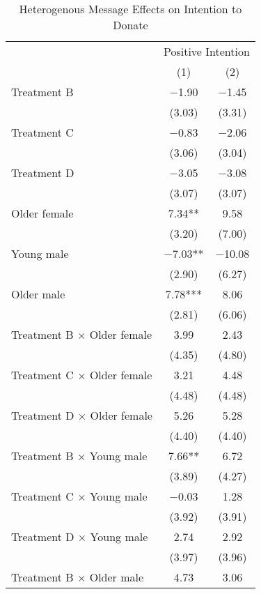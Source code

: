 \documentclass[12pt, a4paper]{article}
\begin{document}
\begin{table}[H]

\caption{\label{tab:int-lm-interaction-reg}Heterogenous Message Effects on Intention to Donate}
\centering
\fontsize{8}{10}\selectfont
\begin{threeparttable}
\begin{tabular}[t]{lcc}
\toprule
\multicolumn{1}{c}{ } & \multicolumn{2}{c}{Positive Intention} \\
\cmidrule(l{3pt}r{3pt}){2-3}
  & (1) & (2)\\
\midrule
Treatment B & \num{-1.90} & \num{-1.45}\\
 & (\num{3.03}) & (\num{3.31})\\
Treatment C & \num{-0.83} & \num{-2.06}\\
 & (\num{3.06}) & (\num{3.04})\\
Treatment D & \num{-3.05} & \num{-3.08}\\
 & (\num{3.07}) & (\num{3.07})\\
Older female & \num{7.34}** & \num{9.58}\\
 & (\num{3.20}) & (\num{7.00})\\
Young male & \num{-7.03}** & \num{-10.08}\\
 & (\num{2.90}) & (\num{6.27})\\
Older male & \num{7.78}*** & \num{8.06}\\
 & (\num{2.81}) & (\num{6.06})\\
Treatment B $\times$ Older female & \num{3.99} & \num{2.43}\\
 & (\num{4.35}) & (\num{4.80})\\
Treatment C $\times$ Older female & \num{3.21} & \num{4.48}\\
 & (\num{4.48}) & (\num{4.48})\\
Treatment D $\times$ Older female & \num{5.26} & \num{5.28}\\
 & (\num{4.40}) & (\num{4.40})\\
Treatment B $\times$ Young male & \num{7.66}** & \num{6.72}\\
 & (\num{3.89}) & (\num{4.27})\\
Treatment C $\times$ Young male & \num{-0.03} & \num{1.28}\\
 & (\num{3.92}) & (\num{3.91})\\
Treatment D $\times$ Young male & \num{2.74} & \num{2.92}\\
 & (\num{3.97}) & (\num{3.96})\\
Treatment B $\times$ Older male & \num{4.73} & \num{3.06}\\

\end{tabular}
\end{threeparttable}
\end{table}
\end{document}
